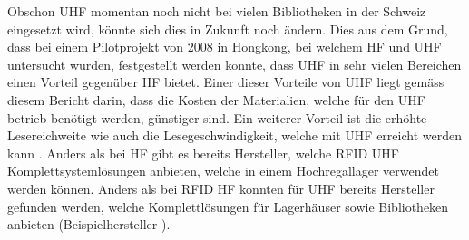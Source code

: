 Obschon UHF momentan noch nicht bei vielen Bibliotheken in der Schweiz eingesetzt wird, könnte sich dies in Zukunft noch ändern. Dies aus dem Grund, dass bei einem Pilotprojekt von 2008 in Hongkong, bei welchem HF und UHF untersucht wurden, festgestellt werden konnte, dass UHF in sehr vielen Bereichen einen Vorteil gegenüber HF bietet. Einer dieser Vorteile von UHF liegt gemäss diesem Bericht darin, dass die Kosten der Materialien, welche für den UHF betrieb benötigt werden, günstiger sind. Ein weiterer Vorteil ist die erhöhte Lesereichweite wie auch die Lesegeschwindigkeit, welche mit UHF erreicht werden kann \parencite{rfidHfVsUhf}. Anders als bei HF gibt es bereits Hersteller, welche RFID UHF Komplettsystemlösungen anbieten, welche in einem Hochregallager verwendet werden können. Anders als bei RFID HF konnten für UHF bereits Hersteller gefunden werden, welche Komplettlösungen für Lagerhäuser sowie Bibliotheken anbieten (Beispielhersteller \cite{litumRFID}).
